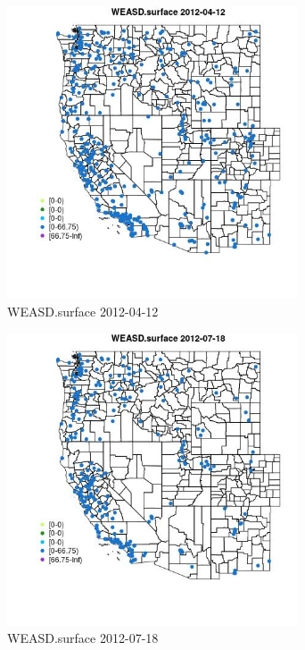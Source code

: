 \begin{figure} 
\centering  
\includegraphics[width=0.77\textwidth]{Code_Outputs/Report_ML_input_PM25_Step4_part_e_de_duplicated_aves_compiled_2019-05-14wNAs_MapObsWEASDsurface2012-04-12.jpg} 
\caption{\label{fig:Report_ML_input_PM25_Step4_part_e_de_duplicated_aves_compiled_2019-05-14wNAsMapObsWEASDsurface2012-04-12}WEASD.surface 2012-04-12} 
\end{figure} 
 

\begin{figure} 
\centering  
\includegraphics[width=0.77\textwidth]{Code_Outputs/Report_ML_input_PM25_Step4_part_e_de_duplicated_aves_compiled_2019-05-14wNAs_MapObsWEASDsurface2012-07-18.jpg} 
\caption{\label{fig:Report_ML_input_PM25_Step4_part_e_de_duplicated_aves_compiled_2019-05-14wNAsMapObsWEASDsurface2012-07-18}WEASD.surface 2012-07-18} 
\end{figure} 
 


